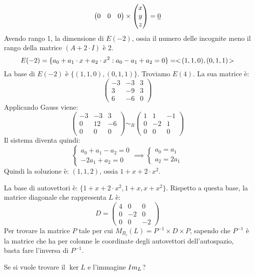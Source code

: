 \begin{exmp}
\[\begin{pmatrix}
0 & 0 & 0
\end{pmatrix}
\times
\begin{pmatrix}
x \\ y \\ z
\end{pmatrix} = \underline{0}
\]
Avendo rango 1, la dimensione di $E(-2)$, ossia il numero delle incognite meno il rango della matrice $(A + 2 \cdot I)$ \`e 2.
\[
E(-2) = \{ a_0 + a_1 \cdot x + a_2 \cdot x^2 : a_0 - a_1 + a_2 = 0 \} =
<\!{(1,1,0),(0,1,1)}\!>
\]
La base di $E(-2)$ \`e $\{ (1,1,0), (0,1,1) \}$. Troviamo $E(4)$. La sua matrice \`e:
\[
\begin{pmatrix}
-3 & -3 & 3 \\
3 & -9 & 3 \\
6 & -6 & 0
\end{pmatrix}
\]
Applicando Gauss viene:
\[
\begin{pmatrix}
-3 & -3 & 3 \\
0 & 12 & -6 \\
0 & 0 & 0
\end{pmatrix}
\sim_R
\begin{pmatrix}
1 & 1 & -1 \\
0 & -2 & 1 \\
0 & 0 & 0
\end{pmatrix}
\]
Il sistema diventa quindi:
\[
\begin{cases}
a_0 + a_1 - a_2 = 0 \\
-2 a_1 + a_2 = 0
\end{cases}
\implies
\begin{cases}
a_0 = a_1 \\
a_2 = 2 a_1
\end{cases}
\]
Quindi la soluzione \`e: $(1, 1, 2)$, ossia $1 + x + 2 \cdot x^2$.

La base di autovettori \`e: $\{ 1 + x + 2 \cdot x^2, 1 + x, x + x^2 \}$. Rispetto a questa base, la matrice diagonale che rappresenta $L$ \`e:
\[
D = 
\begin{pmatrix}
4 & 0 & 0 \\
0 & -2 & 0 \\
0 & 0 & -2
\end{pmatrix}
\]
Per trovare la matrice $P$ tale per cui $M_{B_c} (L) = P^{-1} \times D \times P$, sapendo che $P^{-1}$ \`e la matrice che ha per colonne le coordinate degli autovettori dell'autospazio, basta fare l'inversa di $P^{-1}$.

Se si vuole trovare il $\ker L$ e l'immagine $Im_{L}$?


\end{exmp}
